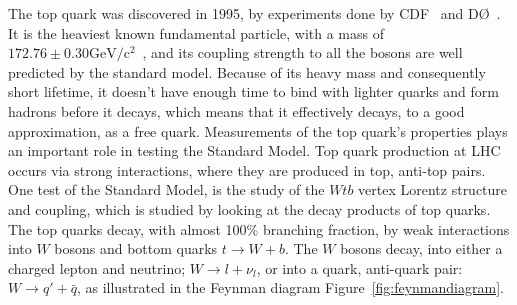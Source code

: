 \documentclass[12pt,a4paper]{article}
\numberwithin{equation}{section}
\begin{document}
The top quark was discovered in 1995, by experiments done by CDF~\cite{Abe_1995}
and DØ~\cite{Abachi_1995}. It is the heaviest known fundamental particle, with a
mass of $172.76 \pm 0.30 \mathrm{GeV/c^2}$~\cite{tmass}, and its coupling
strength to all the bosons are well predicted by the standard model. Because of
its heavy mass and consequently short lifetime, it doesn't have enough time to
bind with lighter quarks and form hadrons before it decays, which means that it
effectively decays, to a good approximation, as a free quark. Measurements of
the top quark's properties plays an important role in testing the Standard
Model. Top quark production at LHC occurs via strong interactions, where they
are produced in top, anti-top pairs. One test of the Standard Model, is the
study of the $Wtb$ vertex Lorentz structure and coupling, which is studied by
looking at the decay products of top quarks. The top quarks decay, with almost
100\% branching fraction, by weak interactions into $W$ bosons and bottom quarks
$t \rightarrow W + b$. The $W$ bosons decay, into either a charged lepton and neutrino;
$W \rightarrow l + \nu_l$, or into a quark, anti-quark pair: $W \rightarrow q' + \bar{q}$, as
illustrated in the Feynman diagram Figure~\ref{fig:feynmandiagram}.\\
\end{document}
